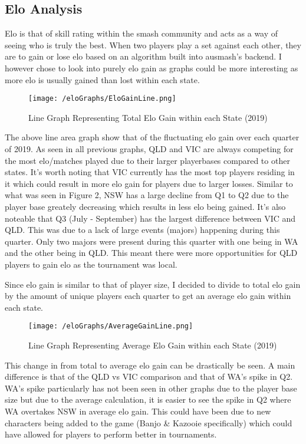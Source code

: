 \documentclass[11pt, oneside, a4paper]{article}
\begin{document}
\newpage
\subsection{Elo Analysis}
Elo is that of skill rating within the smash community and acts as a way of seeing who is truly the best. When two players play a set against each other, they are to gain or lose elo based on an algorithm built into ausmash's backend. I however chose to look into purely elo gain as graphs could be more interesting as more elo is usually gained than lost within each state. 

\begin{figure}[!ht]
	\centerline{\texttt{[image: /eloGraphs/EloGainLine.png]}}
	\caption{Line Graph Representing Total Elo Gain within each State (2019)}
	\label{fig:figure2}
\end{figure}

The above line area graph show that of the fluctuating elo gain over each quarter of 2019. As seen in all previous graphs, QLD and VIC are always competing for the most elo/matches played due to their larger playerbases compared to other states. It's worth noting that VIC currently has the most top players residing in it which could result in more elo gain for players due to larger losses. Similar to what was seen in Figure 2, NSW has a large decline from Q1 to Q2 due to the player base greately decreasing which results in less elo being gained. It's also noteable that Q3 (July - September) has the largest difference between VIC and QLD. This was due to a lack of large events (majors) happening during this quarter. Only two majors were present during this quarter with one being in WA and the other being in QLD. This meant there were more opportunities for QLD players to gain elo as the tournament was local.

\newpage
Since elo gain is similar to that of player size, I decided to divide to total elo gain by the amount of unique players each quarter to get an average elo gain within each state.

\begin{figure}[!ht]
	\centerline{\texttt{[image: /eloGraphs/AverageGainLine.png]}}
	\caption{Line Graph Representing Average Elo Gain within each State (2019)}
	\label{fig:figure2}
\end{figure}

This change in from total to average elo gain can be drastically be seen. A main difference is that of the QLD vs VIC comparison and that of WA's spike in Q2. WA's spike particularly has not been seen in other graphs due to the player base size but due to the average calculation, it is easier to see the spike in Q2 where WA overtakes NSW in average elo gain. This could have been due to new characters being added to the game (Banjo \& Kazooie specifically) which could have allowed for players to perform better in tournaments.
\end{document}
